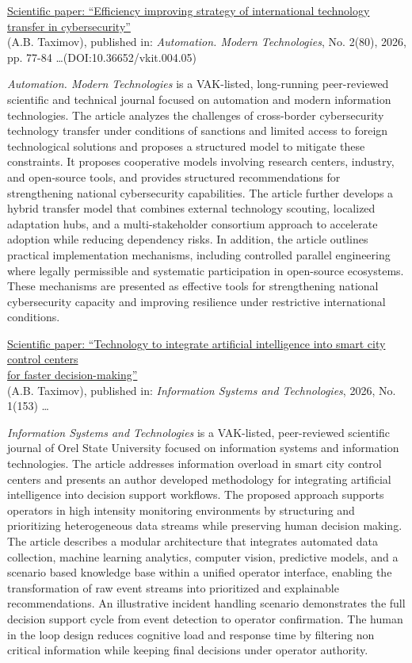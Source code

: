 \noindent\underline{Scientific paper: ``Efficiency improving strategy of international technology transfer in cybersecurity''} \\
(A.B. Taximov), published in: \emph{Automation. Modern Technologies}, No. 2(80), 2026, pp. 77-84  \dots (DOI:10.36652/vkit.004.05)

\emph{Automation. Modern Technologies} is a VAK-listed, long-running peer-reviewed scientific and technical journal focused on automation and modern information technologies. The article analyzes the challenges of cross-border cybersecurity technology transfer under conditions of sanctions and limited access to foreign technological solutions and proposes a structured model to mitigate these constraints. It proposes cooperative models involving research centers, industry, and open-source tools, and provides structured recommendations for strengthening national cybersecurity capabilities. The article further develops a hybrid transfer model that combines external technology scouting, localized adaptation hubs, and a multi-stakeholder consortium approach to accelerate adoption while reducing dependency risks. In addition, the article outlines practical implementation mechanisms, including controlled parallel engineering where legally permissible and systematic participation in open-source ecosystems. These mechanisms are presented as effective tools for strengthening national cybersecurity capacity and improving resilience under restrictive international conditions.
\bigskip

\noindent\underline{Scientific paper: ``Technology to integrate artificial intelligence into smart city control centers} \\
\underline{for faster decision-making''} \\
(A.B. Taximov), published in: \emph{Information Systems and Technologies}, 2026, No. 1(153) \dots

\emph{Information Systems and Technologies} is a VAK-listed, peer-reviewed scientific journal of Orel State University focused on information systems and information technologies. The article addresses information overload in smart city control centers and presents an author developed methodology for integrating artificial intelligence into decision support workflows. The proposed approach supports operators in high intensity monitoring environments by structuring and prioritizing heterogeneous data streams while preserving human decision making. The article describes a modular architecture that integrates automated data collection, machine learning analytics, computer vision, predictive models, and a scenario based knowledge base within a unified operator interface, enabling the transformation of raw event streams into prioritized and explainable recommendations. An illustrative incident handling scenario demonstrates the full decision support cycle from event detection to operator confirmation. The human in the loop design reduces cognitive load and response time by filtering non critical information while keeping final decisions under operator authority.
